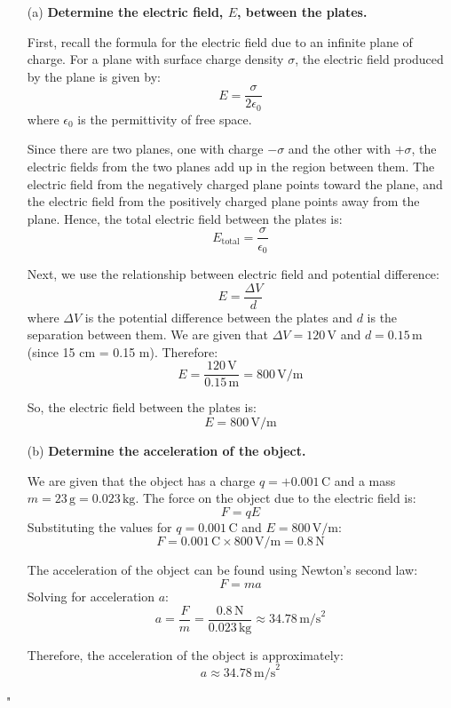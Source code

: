 \begin{enumerate}
    \item[(a)] \textbf{Determine the electric field, $E$, between the plates.}

    First, recall the formula for the electric field due to an infinite plane of charge. For a plane with surface charge density $\sigma$, the electric field produced by the plane is given by:
    \[
    E = \frac{\sigma}{2\epsilon_0}
    \]
    where $\epsilon_0$ is the permittivity of free space.

    Since there are two planes, one with charge $-\sigma$ and the other with $+\sigma$, the electric fields from the two planes add up in the region between them. The electric field from the negatively charged plane points toward the plane, and the electric field from the positively charged plane points away from the plane. Hence, the total electric field between the plates is:
    \[
    E_{\text{total}} = \frac{\sigma}{\epsilon_0}
    \]

    Next, we use the relationship between electric field and potential difference:
    \[
    E = \frac{\Delta V}{d}
    \]
    where $\Delta V$ is the potential difference between the plates and $d$ is the separation between them. We are given that $\Delta V = 120 \, \text{V}$ and $d = 0.15 \, \text{m}$ (since 15 cm = 0.15 m). Therefore:
    \[
    E = \frac{120 \, \text{V}}{0.15 \, \text{m}} = 800 \, \text{V/m}
    \]

    So, the electric field between the plates is:
    \[
    E = 800 \, \text{V/m}
    \]

    \item[(b)] \textbf{Determine the acceleration of the object.}

    We are given that the object has a charge $q = +0.001 \, \text{C}$ and a mass $m = 23 \, \text{g} = 0.023 \, \text{kg}$. The force on the object due to the electric field is:
    \[
    F = qE
    \]
    Substituting the values for $q = 0.001 \, \text{C}$ and $E = 800 \, \text{V/m}$:
    \[
    F = 0.001 \, \text{C} \times 800 \, \text{V/m} = 0.8 \, \text{N}
    \]

    The acceleration of the object can be found using Newton’s second law:
    \[
    F = ma
    \]
    Solving for acceleration $a$:
    \[
    a = \frac{F}{m} = \frac{0.8 \, \text{N}}{0.023 \, \text{kg}} \approx 34.78 \, \text{m/s}^2
    \]

    Therefore, the acceleration of the object is approximately:
    \[
    a \approx 34.78 \, \text{m/s}^2
    \]
\end{enumerate}"

